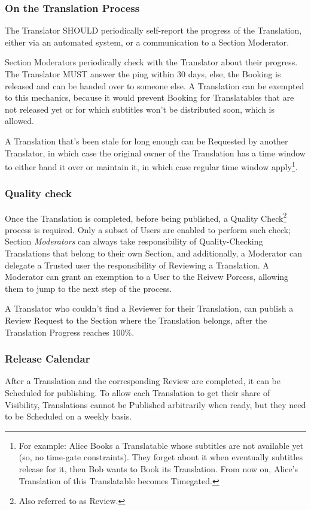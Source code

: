 \documentclass[12pt]{book}
\begin{document}
	\subsubsection{On the Translation Process}
	The Translator SHOULD periodically self-report the progress of the Translation, either via an automated system, or a communication to a Section Moderator. 
	
	Section Moderators periodically check with the Translator about their progress. The Translator MUST answer the ping within 30 days, else, the Booking is released and can be handed over to someone else. A Translation can be exempted to this mechanics, because it would prevent Booking for Translatables that are not released yet or for which subtitles won't be distributed soon, which is allowed. 
	
	A Translation that's been stale for long enough can be Requested by another Translator, in which case the original owner of the Translation has a time window to either hand it over or maintain it, in which case regular time window apply\footnote{For example: Alice Books a Translatable whose subtitles are not available yet (so, no time-gate constraints). They forget about it when eventually subtitles release for it, then Bob wants to Book its Translation. From now on, Alice's Translation of this Translatable becomes Timegated.}.
	
	\subsubsection{Quality check}
	Once the Translation is completed, before being published, a Quality Check\footnote{Also referred to as Review.} process is required. Only a subset of Users are enabled to perform such check; Section \emph{Moderators} can always take responsibility of Quality-Checking Translations that belong to their own Section, and additionally, a Moderator can delegate a Trusted user the responsibility of Reviewing a Translation. A Moderator can grant an exemption to a User to the Reivew Porcess, allowing them to jump to the next step of the process.
	
	A Translator who couldn't find a Reviewer for their Translation, can publish a Review Request to the Section where the Translation belongs, after the Translation Progress reaches $100\%$.
	
	\subsubsection{Release Calendar}
	After a Translation and the corresponding Review are completed, it can be Scheduled for publishing. To allow each Translation to get their share of Visibility, Translations cannot be Published arbitrarily when ready, but they need to be Scheduled on a weekly basis. 
	
\end{document}
